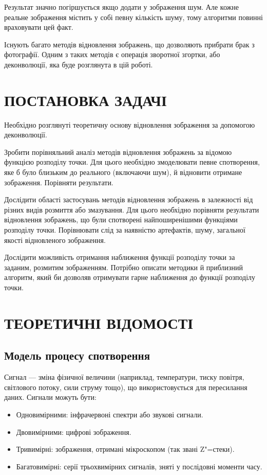 \documentclass{diploma}
\begin{document}
  Результат значно погіршується якщо додати у зображення шум.
  Але кожне реальне зображення містить у собі певну кількість шуму, тому
  алгоритми повинні враховувати цей факт.

  Існують багато методів відновлення зображень, що дозволяють прибрати брак з
  фотографії.
  Одним з таких методів є операція зворотної згортки, або деконволюції, яка
  буде розглянута в цій роботі.
  \clearpage
\chapter{ПОСТАНОВКА ЗАДАЧІ}
\pagestyle{plain}
  Необхідно розглянуті теоретичну основу відновлення зображення за допомогою
  деконволюції.

  Зробити порівняльний аналіз методів відновлення зображень за відомою
  функцією розподілу точки.
  Для цього необхідно змоделювати певне спотворення, яке б було близьким до
  реального (включаючи шум), й відновити отримане зображення.
  Порівняти результати.

  Дослідити області застосувань методів відновлення зображень в залежності від
  різних видів розмиття або змазування.
  Для цього необхідно порівняти результати відновлення зображень, що були
  спотворені найпоширенішими функціями розподілу точки.
  Порівнювати слід за наявністю артефактів, шуму, загальної якості
  відновленого зображення.

  Дослідити можливість отримання наближення функції розподілу точки за
  заданим, розмитим зображенням.
  Потрібно описати методики й приблизний алгоритм, який би дозволяв отримувати
  гарне наближення до функції розподілу точки.
  \clearpage

\chapter{ТЕОРЕТИЧНІ ВІДОМОСТІ}
  \section{Модель процесу спотворення}
    Сигнал --- зміна фізичної величини (наприклад, температури, тиску
    повітря, світлового потоку, сили струму тощо), що використовується для
    пересилання даних.
    Сигнали можуть бути:
    \begin{itemize}
      \item Одновимірними: інфрачервоні спектри або звукові сигнали.
      \item Двовимірними: цифрові зображення.
      \item Тривимірні: зображення, отримані мікроскопом (так звані Z"=стеки).
      \item Багатовимірні: серії трьохвимірних сигналів, зняті у послідовні
        моменти часу.
    \end{itemize}
\end{document}
